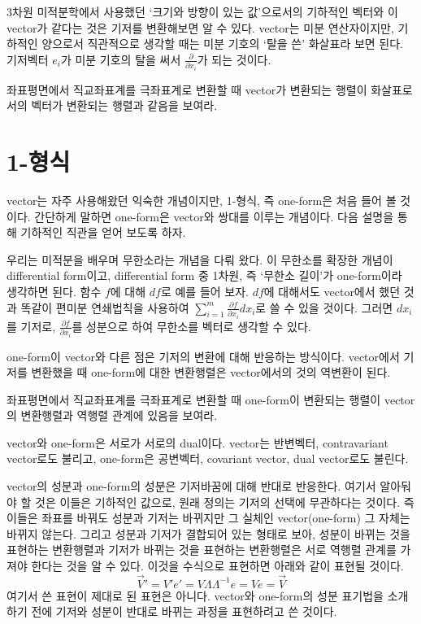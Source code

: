3차원 미적분학에서 사용했던 `크기와 방향이 있는 값'으로서의 기하적인 벡터와 이 vector가 같다는 것은 기저를 변환해보면 알 수 있다. vector는 미분 연산자이지만, 기하적인 양으로서 직관적으로 생각할 때는 미분 기호의 `탈을 쓴' 화살표라 보면 된다. 기저벡터 ${e_i}$가 미분 기호의 탈을 써서 $\frac{\partial}{\partial x_i}$가 되는 것이다.

\begin{exercise}
    좌표평면에서 직교좌표계를 극좌표계로 변환할 때 vector가 변환되는 행렬이 화살표로서의 벡터가 변환되는 행렬과 같음을 보여라.
\end{exercise}
\section{1-형식}
vector는 자주 사용해왔던 익숙한 개념이지만, 1-형식, 즉 one-form은 처음 들어 볼 것이다. 간단하게 말하면 one-form은 vector와 쌍대를 이루는 개념이다. 다음 설명을 통해 기하적인 직관을 얻어 보도록 하자.

우리는 미적분을 배우며 무한소라는 개념을 다뤄 왔다. 이 무한소를 확장한 개념이 differential form이고, differential form 중 1차원, 즉 `무한소 길이'가 one-form이라 생각하면 된다. 함수 $f$에 대해 $df$로 예를 들어 보자. $df$에 대해서도 vector에서 했던 것과 똑같이 편미분 연쇄법칙을 사용하여 $\sum_{i=1}^m \frac{\partial f}{\partial x_i} dx_i$로 쓸 수 있을 것이다. 그러면 $dx_i$를 기저로, $\frac{\partial f}{\partial x_i}$를 성분으로 하여 무한소를 벡터로 생각할 수 있다.

one-form이 vector와 다른 점은 기저의 변환에 대해 반응하는 방식이다. vector에서 기저를 변환했을 때 one-form에 대한 변환행렬은 vector에서의 것의 역변환이 된다.
\begin{exercise}
    좌표평면에서 직교좌표계를 극좌표계로 변환할 때 one-form이 변환되는 행렬이 vector의 변환행렬과 역행렬 관계에 있음을 보여라.
\end{exercise}

vector와 one-form은 서로가 서로의 dual이다. vector는 반변벡터, contravariant vector로도 불리고, one-form은 공변벡터, covariant vector, dual vector로도 불린다.

vector의 성분과 one-form의 성분은 기저바꿈에 대해 반대로 반응한다. 여기서 알아둬야 할 것은 이들은 기하적인 값으로, 원래 정의는 기저의 선택에 무관하다는 것이다. 즉 이들은 좌표를 바꿔도 성분과 기저는 바뀌지만 그 실체인 vector(one-form) 그 자체는 바뀌지 않는다. 그리고 성분과 기저가 결합되어 있는 형태로 보아, 성분이 바뀌는 것을 표현하는 변환행렬과 기저가 바뀌는 것을 표현하는 변환행렬은 서로 역행렬 관계를 가져야 한다는 것을 알 수 있다. 이것을 수식으로 표현하면 아래와 같이 표현될 것이다.
\begin{equation}
    \vec{V}'=V' e' =V\Lambda \Lambda^{-1} e=Ve=\vec{V}
\end{equation}
여기서 쓴 표현이 제대로 된 표현은 아니다. vector와 one-form의 성분 표기법을 소개하기 전에 기저와 성분이 반대로 바뀌는 과정을 표현하려고 쓴 것이다.

